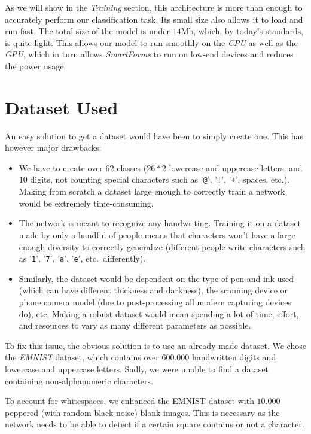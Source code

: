 \documentclass[11pt, a4paper]{report}
\def\code#1{\texttt{#1}}
\begin{document}
As we will show in the \textit{Training} section, this architecture is more than enough to accurately perform our classification task. Its small size also allows it to load and run fast. The total size of the model is under $14$Mb, which, by today's standards, is quite light. This allows our model to run smoothly on the \textit{CPU} as well as the \textit{GPU}, which in turn allows \textit{SmartForms} to run on low-end devices and reduces the power usage. 

\section{Dataset Used}

An easy solution to get a dataset would have been to simply create one. This has however major drawbacks:
\begin{itemize}
	\item We have to create over $62$ classes ($26*2$ lowercase and uppercase letters, and $10$ digits, not counting special characters such as '\code{@}', '\code{!}', '\code{+}', spaces, etc.). Making from scratch a dataset large enough to correctly train a network would be extremely time-consuming.
	\item The network is meant to recognize any handwriting. Training it on a dataset made by only a handful of people means that characters won't have a large enough diversity to correctly generalize (different people write characters such as '\code{1}', '\code{7}', '\code{a}', '\code{e}', etc.~differently).
	\item Similarly, the dataset would be dependent on the type of pen and ink used (which can have different thickness and darkness), the scanning device or phone camera model (due to post-processing all modern capturing devices do), etc. Making a robust dataset would mean spending a lot of time, effort, and resources to vary as many different parameters as possible. 
\end{itemize}

To fix this issue, the obvious solution is to use an already made dataset.
We chose the \textit{EMNIST} \cite{emnist} dataset, which contains over $600.000$ handwritten digits and lowercase and uppercase letters. Sadly, we were unable to find a dataset containing non-alphanumeric characters.

To account for whitespaces, we enhanced the EMNIST dataset with $10.000$ peppered (with random black noise) blank images. This is necessary as the network needs to be able to detect if a certain square contains or not a character.
\end{document}
